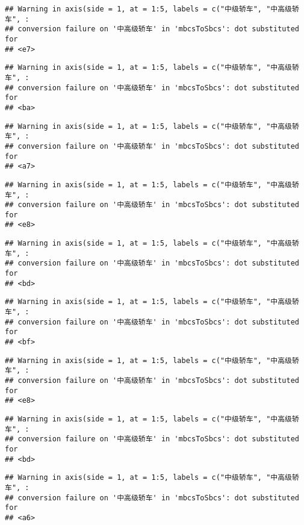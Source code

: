 \documentclass[]{article}
\begin{document}
\begin{verbatim}
## Warning in axis(side = 1, at = 1:5, labels = c("中级轿车", "中高级轿车", :
## conversion failure on '中高级轿车' in 'mbcsToSbcs': dot substituted for
## <e7>
\end{verbatim}

\begin{verbatim}
## Warning in axis(side = 1, at = 1:5, labels = c("中级轿车", "中高级轿车", :
## conversion failure on '中高级轿车' in 'mbcsToSbcs': dot substituted for
## <ba>
\end{verbatim}

\begin{verbatim}
## Warning in axis(side = 1, at = 1:5, labels = c("中级轿车", "中高级轿车", :
## conversion failure on '中高级轿车' in 'mbcsToSbcs': dot substituted for
## <a7>
\end{verbatim}

\begin{verbatim}
## Warning in axis(side = 1, at = 1:5, labels = c("中级轿车", "中高级轿车", :
## conversion failure on '中高级轿车' in 'mbcsToSbcs': dot substituted for
## <e8>
\end{verbatim}

\begin{verbatim}
## Warning in axis(side = 1, at = 1:5, labels = c("中级轿车", "中高级轿车", :
## conversion failure on '中高级轿车' in 'mbcsToSbcs': dot substituted for
## <bd>
\end{verbatim}

\begin{verbatim}
## Warning in axis(side = 1, at = 1:5, labels = c("中级轿车", "中高级轿车", :
## conversion failure on '中高级轿车' in 'mbcsToSbcs': dot substituted for
## <bf>
\end{verbatim}

\begin{verbatim}
## Warning in axis(side = 1, at = 1:5, labels = c("中级轿车", "中高级轿车", :
## conversion failure on '中高级轿车' in 'mbcsToSbcs': dot substituted for
## <e8>
\end{verbatim}

\begin{verbatim}
## Warning in axis(side = 1, at = 1:5, labels = c("中级轿车", "中高级轿车", :
## conversion failure on '中高级轿车' in 'mbcsToSbcs': dot substituted for
## <bd>
\end{verbatim}

\begin{verbatim}
## Warning in axis(side = 1, at = 1:5, labels = c("中级轿车", "中高级轿车", :
## conversion failure on '中高级轿车' in 'mbcsToSbcs': dot substituted for
## <a6>
\end{verbatim}
\end{document}
